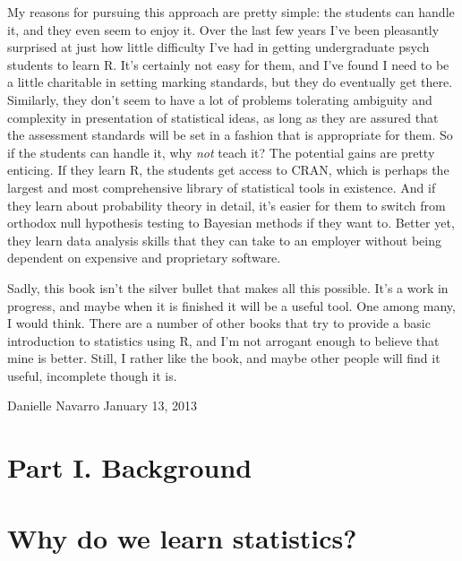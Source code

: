\documentclass[
]{book}
\begin{document}
My reasons for pursuing this approach are pretty simple: the students can handle it, and they even seem to enjoy it. Over the last few years I've been pleasantly surprised at just how little difficulty I've had in getting undergraduate psych students to learn R. It's certainly not easy for them, and I've found I need to be a little charitable in setting marking standards, but they do eventually get there. Similarly, they don't seem to have a lot of problems tolerating ambiguity and complexity in presentation of statistical ideas,
as long as they are assured that the assessment standards will be set in a fashion that is appropriate for them. So if the students can handle it, why \emph{not} teach it? The potential gains are pretty enticing. If they learn R, the students get access to CRAN, which is perhaps the largest and most comprehensive library of statistical tools in existence. And if they learn about probability theory in detail, it's easier for them to switch from orthodox null hypothesis testing to Bayesian methods if they want to. Better yet, they learn data analysis skills that they can take to an employer without being dependent on expensive and proprietary software.

Sadly, this book isn't the silver bullet that makes all this possible. It's a work in progress, and maybe when it is finished it will be a useful tool. One among many, I would think. There are a number of other books that try to provide a basic introduction to statistics using R, and I'm not arrogant enough to believe that mine is better. Still, I rather like the book, and maybe other people will find it useful, incomplete though it is.

Danielle Navarro
January 13, 2013

\hypertarget{part-i.-background}{%
\chapter*{Part I. Background}\label{part-i.-background}}

\hypertarget{why-do-we-learn-statistics}{%
\chapter{Why do we learn statistics?}\label{why-do-we-learn-statistics}}
\end{document}
